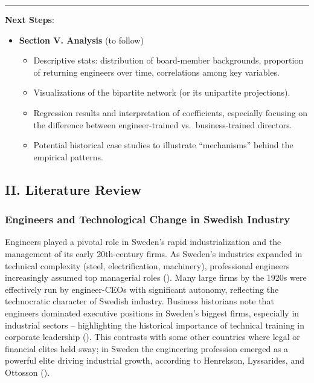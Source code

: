 \documentclass[
]{article}
\providecommand{\tightlist}{%
  \setlength{\itemsep}{0pt}\setlength{\parskip}{0pt}}\usepackage{longtable,booktabs,array}
\begin{document}
\begin{center}\rule{0.5\linewidth}{0.5pt}\end{center}

\textbf{Next Steps}:

\begin{itemize}
\tightlist
\item
  \textbf{Section V. Analysis} (to follow)

  \begin{itemize}
  \tightlist
  \item
    Descriptive stats: distribution of board-member backgrounds,
    proportion of returning engineers over time, correlations among key
    variables.\\
  \item
    Visualizations of the bipartite network (or its unipartite
    projections).\\
  \item
    Regression results and interpretation of coefficients, especially
    focusing on the difference between engineer-trained
    vs.~business-trained directors.\\
  \item
    Potential historical case studies to illustrate ``mechanisms''
    behind the empirical patterns.
  \end{itemize}
\end{itemize}

\subsection{II. Literature Review}\label{ii.-literature-review-1}

\subsubsection{Engineers and Technological Change in Swedish
Industry}\label{engineers-and-technological-change-in-swedish-industry}

Engineers played a pivotal role in Sweden's rapid industrialization and
the management of its early 20th-century firms. As Sweden's industries
expanded in technical complexity (steel, electrification, machinery),
professional engineers increasingly assumed top managerial
roles\hspace{0pt}
().
Many large firms by the 1920s were effectively run by engineer-CEOs with
significant autonomy, reflecting the technocratic character of Swedish
industry. Business historians note that engineers dominated executive
positions in Sweden's biggest firms, especially in industrial sectors --
highlighting the historical importance of technical training in
corporate leadership
(). This contrasts with some other
countries where legal or financial elites held sway; in Sweden the
engineering profession emerged as a powerful elite driving industrial
growth\hspace{0pt}, according to Henrekson, Lyssarides, and Ottosson
().
\end{document}
